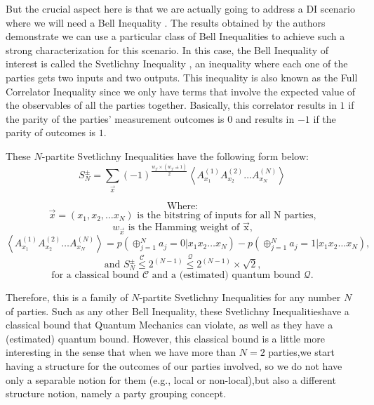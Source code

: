 \documentclass[12pt]{article}
\begin{document}
    But the crucial aspect here is that we are actually going to address a DI scenario where we will need a Bell Inequality \cite{bell:einstein-podolsky-rosen-paradox:1964:02-2024}. The results obtained by the authors demonstrate we can use a particular class of Bell Inequalities to achieve such a strong characterization for this scenario. In this case, the Bell Inequality of interest is called the Svetlichny Inequality \cite{svetlivhny:distinguishing-three-body-from-two-body-nonseparability-bell-type-inequality:1987:02-2024,seevinck-svetlichny:bell-type-inequalities-partial-separability-particle-systems-and-quantum-mechanical-violations:2002:02-2024}, an inequality where each one of the parties gets two inputs and two outputs. This inequality is also known as the Full Correlator Inequality since we only have terms that involve the expected value of the observables of all the parties together. Basically, this correlator results in $1$ if the parity of the parties' measurement outcomes is $0$ and results in $-1$ if the parity of outcomes is $1$.

    \noindent These $N$-partite Svetlichny Inequalities have the following form below:
    $$ {S}_{N}^{\pm} = \sum_{\vec{x}} {(-1)}^{\frac{{w}_{\vec{x}} \times ({w}_{\vec{x}} \pm 1)}{2}} \left\langle {A}_{{x}_{1}}^{(1)} {A}_{{x}_{2}}^{(2)} \dots {A}_{{x}_{N}}^{(N)} \right\rangle $$
    
    $$ \mathrm{\text{Where:}} $$
    $$ \vec{x} = ({x}_{1}, {x}_{2}, \dots {x}_{N})\mathrm{\text{ is the bitstring of inputs for all $N$ parties,}} $$
    $$ {w}_{\vec{x}}\mathrm{\text{ is the Hamming weight of $\vec{x}$,}} $$
    $$ \left\langle {A}_{{x}_{1}}^{(1)} {A}_{{x}_{2}}^{(2)} \dots {A}_{{x}_{N}}^{(N)} \right\rangle = p\left( {\oplus}_{j=1}^{N} {a}_{j} = 0 | {x}_{1}{x}_{2} \dots {x}_{N} \right) - p\left( {\oplus}_{j=1}^{N} {a}_{j} = 1 | {x}_{1}{x}_{2} \dots {x}_{N} \right)\mathrm{\text{,}} $$
    $$ \mathrm{\text{and }} {S}_{N}^{\pm} \stackrel{\mathcal{C}}{\leq} {2}^{(N - 1)} \stackrel{\mathcal{Q}}{\leq} {2}^{(N - 1)} \times \sqrt{2}\mathrm{\text{,}} $$
    $$ \mathrm{\text{for a classical bound $\mathcal{C}$ and a (estimated) quantum bound $\mathcal{Q}$.}} $$

    \noindent Therefore, this is a family of $N$-partite Svetlichny Inequalities for any number $N$ of parties. Such as any other Bell Inequality, these Svetlichny Inequalities\break have a classical bound that Quantum Mechanics can violate, as well as they have a (estimated) quantum bound. However, this classical bound is a little more interesting in the sense that when we have more than $N = 2$ parties,\break we start having a structure for the outcomes of our parties involved, so we do not have only a separable notion for them (e.g., local or non-local),\break but also a different structure notion, namely a party grouping concept.
    
\end{document}
